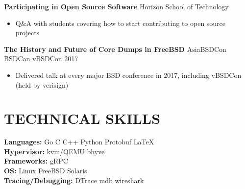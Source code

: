 \documentclass{res}
\begin{document}
\begin{resume}
\vspace{-.05in}
{\bf Participating in Open Source Software} Horizon School of Technology
\begin{itemize}
  \item Q\&A with students covering how to start contributing to open source projects
\end{itemize}

\vspace{-.05in}
{\bf The History and Future of Core Dumps in FreeBSD} AsiaBSDCon BSDCan vBSDCon 2017
\begin{itemize}
  \item Delivered talk at every major BSD conference in 2017, including vBSDCon (held by verisign)
\end{itemize}

\section{TECHNICAL SKILLS}          
\vspace{.05in}
    {\bf Languages:} Go  C  C++  Python Protobuf \LaTeX{} \\
    {\bf Hypervisor:} kvm/QEMU bhyve\\
    {\bf Frameworks:} gRPC \\
    {\bf OS:} Linux FreeBSD Solaris  \\
    {\bf Tracing/Debugging:} DTrace mdb wireshark \\
 
 
\end{resume}
\end{document}
